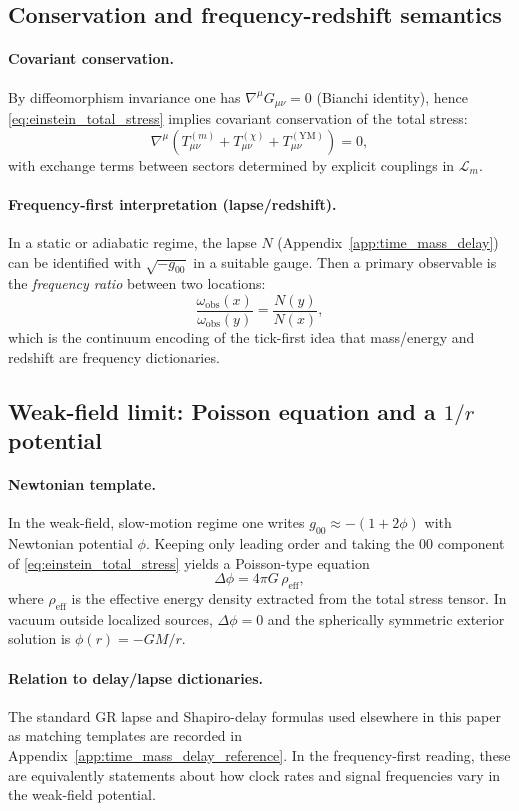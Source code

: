 \subsection{Conservation and frequency-redshift semantics}
\label{subsec:conservation_redshift}

\paragraph{Covariant conservation.}
\MathTag By diffeomorphism invariance one has $\nabla^\mu G_{\mu\nu}=0$ (Bianchi identity), hence \eqref{eq:einstein_total_stress} implies covariant conservation of the total stress:
\begin{equation}
\label{eq:total_stress_conservation}
\nabla^\mu\left(T^{(m)}_{\mu\nu}+T^{(\chi)}_{\mu\nu}+T^{(\mathrm{YM})}_{\mu\nu}\right)=0,
\end{equation}
with exchange terms between sectors determined by explicit couplings in $\mathcal{L}_m$.

\paragraph{Frequency-first interpretation (lapse/redshift).}
\InterfaceTag In a static or adiabatic regime, the lapse $N$ (Appendix~\ref{app:time_mass_delay}) can be identified with $\sqrt{-g_{00}}$ in a suitable gauge.
Then a primary observable is the \emph{frequency ratio} between two locations:
\[
\frac{\omega_{\mathrm{obs}}(x)}{\omega_{\mathrm{obs}}(y)}=\frac{N(y)}{N(x)},
\]
which is the continuum encoding of the tick-first idea that mass/energy and redshift are frequency dictionaries.

\subsection{Weak-field limit: Poisson equation and a \texorpdfstring{$1/r$}{1/r} potential}
\label{subsec:weak_field_poisson}

\paragraph{Newtonian template.}
\InterfaceTag In the weak-field, slow-motion regime one writes
$g_{00}\approx -(1+2\phi)$ with Newtonian potential $\phi$.
Keeping only leading order and taking the $00$ component of \eqref{eq:einstein_total_stress} yields a Poisson-type equation
\[
\Delta\phi = 4\pi G\,\rho_{\mathrm{eff}},
\]
where $\rho_{\mathrm{eff}}$ is the effective energy density extracted from the total stress tensor.
In vacuum outside localized sources, $\Delta\phi=0$ and the spherically symmetric exterior solution is $\phi(r)=-GM/r$.

\paragraph{Relation to delay/lapse dictionaries.}
\MatchTag The standard GR lapse and Shapiro-delay formulas used elsewhere in this paper as matching templates are recorded in Appendix~\ref{app:time_mass_delay_reference}.
In the frequency-first reading, these are equivalently statements about how clock rates and signal frequencies vary in the weak-field potential.


